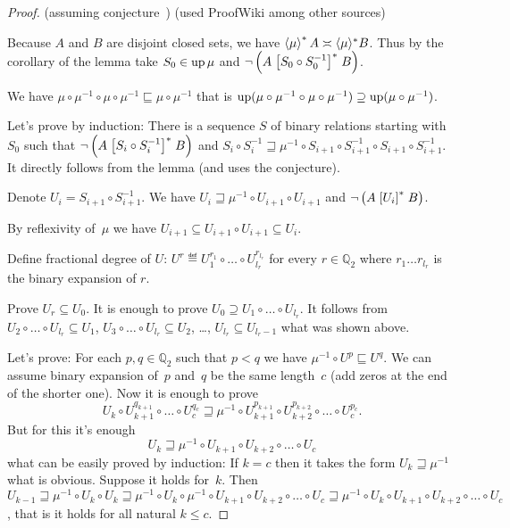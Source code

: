 \begin{proof}
(assuming conjecture~) (used ProofWiki among other sources)

Because $A$ and $B$ are disjoint closed sets, we
have $\left\langle \mu\right\rangle ^{\ast} A \asymp \langle \mu
\rangle^{\ast} B$. Thus by the corollary of the lemma take $S_0 \in \operatorname{up}
\mu$ and $\neg \left( A \mathrel{\left[S_0 \circ S_0^{- 1}\right]^{\ast}} B
\right)$.

We have $\mu \circ \mu^{- 1} \circ \mu \circ \mu^{- 1}
\sqsubseteq \mu \circ \mu^{- 1}$ that is $\operatorname{up} (\mu
\circ \mu^{- 1} \circ \mu \circ \mu^{- 1}) \supseteq
\operatorname{up} (\mu \circ \mu^{- 1})$.

Let's prove by induction: There is a sequence $S$ of binary relations starting
with $S_0$ such that $\neg \left( A \mathrel{\left[S_i \circ S_i^{- 1}\right]^{\ast}} B
\right)$ and $S_i \circ S_i^{- 1} \sqsupseteq \mu^{-1} \circ S_{i + 1} \circ S_{i + 1}^{- 1}
\circ S_{i + 1} \circ S_{i + 1}^{- 1}$. It directly follows from the lemma
(and uses the conjecture).

Denote $U_i = S_{i + 1} \circ S_{i + 1}^{- 1}$. We have $U_i \sqsupseteq \mu^{-1} \circ U_{i +
1} \circ U_{i + 1}$ and $\neg \left( A \mathrel{\left[U_i\right]^{\ast}} B \right)$.

By reflexivity of~$\mu$ we have $U_{i+1} \subseteq U_{i+1}\circ U_{i+1} \subseteq U_i$.

Define fractional degree of $U$: $U^r \eqdef U_1^{r_1} \circ
\ldots \circ U_{l_r}^{r_{l_r}}$ for every $r \in \mathbb{Q}_2$ where $r_1
\ldots r_{l_r}$ is the binary expansion of $r$.

Prove $U_r\subseteq U_0$. It is enough to prove
$U_0 \supseteq U_1 \circ \ldots \circ U_{l_r}$. It follows from $U_2 \circ
\ldots \circ U_{l_r} \subseteq U_1$, $U_3 \circ \ldots \circ U_{l_r} \subseteq
U_2$, \dots, $U_{l_r} \subseteq U_{l_r - 1}$ what was shown above.

Let's prove: For each $p,q\in\mathbb{Q}_2$ such that $p<q$ we have $\mu^{-1}\circ U^p\sqsubseteq U^q$.
We can assume binary expansion of~$p$ and~$q$ be the same length~$c$ (add zeros at the end of the shorter one).
Now it is enough to prove
\[ U_k\circ U_{k+1}^{q_{k+1}}\circ\dots\circ U_c^{q_c}\sqsupseteq\mu^{-1}\circ U_{k+1}^{p_{k+1}}\circ U_{k+2}^{p_{k+2}}\circ\dots\circ U_c^{p_c}. \]
But for this it's enough
\[ U_k\sqsupseteq\mu^{-1}\circ U_{k+1}\circ U_{k+2}\circ\dots\circ U_c \]
what can be easily proved by induction:
If $k=c$ then it takes the form $U_k\sqsupseteq\mu^{-1}$
what is obvious.
Suppose it holds for~$k$. Then $U_{k-1}\sqsupseteq\mu^{-1}\circ U_k\circ U_k\sqsupseteq
\mu^{-1}\circ U_k\circ \mu^{-1}\circ U_{k+1}\circ U_{k+2}\circ\dots\circ U_c\sqsupseteq
\mu^{-1}\circ U_k\circ U_{k+1}\circ U_{k+2}\circ\dots\circ U_c$, that is it holds
for all natural $k\leq c$.


\end{proof}
